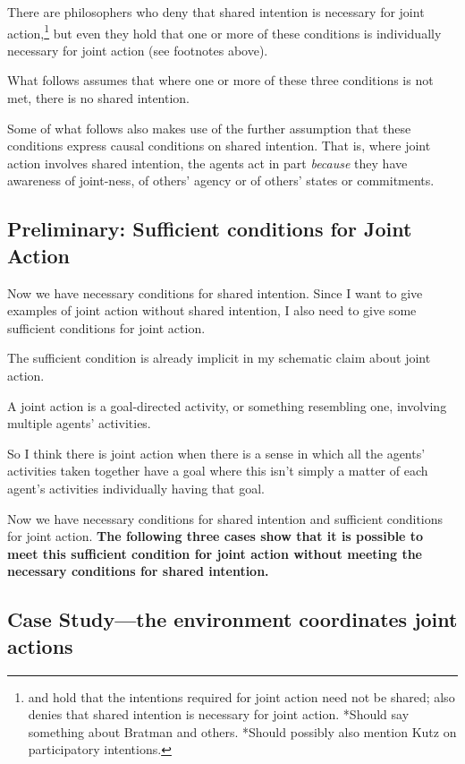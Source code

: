\documentclass[14pt,a4paper]{extarticle}
\begin{document}
There are philosophers who deny that shared intention is necessary for joint action,\footnote
{
\citet[p.\ 407]{Roth:2004ki} and \citet{Searle:1990em}  hold that the intentions required for joint action need not be shared; \citet{miller_social_2001} also denies that shared intention is necessary for joint action.
*Should say something about Bratman and others.
*Should possibly also mention Kutz on participatory intentions.
}
but even they hold that one or more of these conditions is individually necessary for joint action (see footnotes above).

What follows assumes that where one or more of these three conditions is not met, there is no shared intention. 

Some of what follows also makes use of the further assumption that these conditions express causal conditions on shared intention.  That is, where joint action involves shared intention, the agents act in part \emph{because} they have awareness of joint-ness, of others' agency or of others' states or commitments.


\subsection{Preliminary: Sufficient conditions for Joint Action}

Now we have necessary conditions for shared intention.  
Since I want to give examples of joint action without shared intention, I also need to give some sufficient conditions for joint action.  

The sufficient condition is already implicit in my schematic claim about joint action.

A joint action is a goal-directed activity, or something resembling one, involving multiple agents' activities.

So I think there is joint action when there is a sense in which all the agents' activities taken together have a goal where this isn’t simply a matter of each agent's activities individually having that goal. 

Now we have necessary conditions for shared intention and sufficient conditions for joint action.
\textbf{The following three cases show that it is possible to meet this sufficient condition for joint action without meeting the necessary conditions for shared intention.}



\subsection{Case Study---the environment coordinates joint actions}
\end{document}
